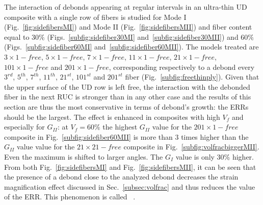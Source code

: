 \documentclass[review]{elsarticle}
\begin{document}
The interaction of debonds appearing at regular intervals in an ultra-thin UD composite with a single row of fibers is studied for Mode I (Fig.~\ref{fig:sidefibersMI}) and Mode II (Fig.~\ref{fig:sidefibersMII}) and fiber content equal to $30\%$ (Figs.~\ref{subfig:sidefiber30MI} and~\ref{subfig:sidefiber30MII}) and $60\%$ (Figs.~\ref{subfig:sidefiber60MI} and~\ref{subfig:sidefiber60MII}). The models treated are $3\times 1-free$, $5\times 1-free$, $7\times 1-free$, $11\times 1-free$, $21\times 1-free$, $101\times 1-free$ and $201\times 1-free$, corresponding respectively to a debond every $3^{rd}$, $5^{th}$, $7^{th}$, $11^{th}$, $21^{st}$, $101^{st}$ and $201^{st}$ fiber (Fig.~\ref{subfig:freethinply}). Given that the upper surface of the UD row is left free, the interaction with the debonded fiber in the next RUC is stronger than in any other case and the results of this section are thus the most conservative in terms of debond's growth: the ERRs should be the largest. The effect is enhanced in composites with high $V_{f}$ and especially for $G_{II}$: at $V_{f}=60\%$ the highest $G_{II}$ value for the $201\times 1-free$ composite in Fig.~\ref{subfig:sidefiber60MII} is more than $3$ times higher than the $G_{II}$ value value for the $21\times21-free$ composite in Fig.~\ref{subfig:volfracbiggerMII}. Even the maximum is shifted to larger angles. The $G_{I}$ value is only 30\% higher.\\
From both Fig.~\ref{fig:sidefibersMI} and Fig.~\ref{fig:sidefibersMII}, it can be seen that the presence of a debond close to the analyzed debond decreases the strain magnification effect discussed in Sec.~\ref{subsec:volfrac} and thus reduces the value of the ERR. This phenomenon is called ~\cite{Garcia2015}.
\end{document}
